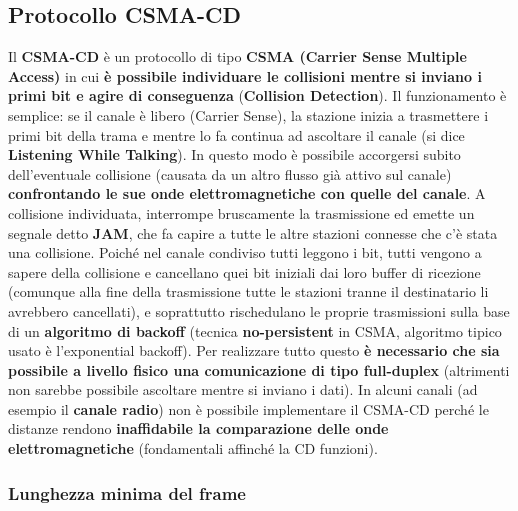\documentclass[12pt]{article}
\begin{document}
\subsection{Protocollo CSMA-CD}

Il \textbf{CSMA-CD} è un protocollo di tipo \textbf{CSMA (Carrier Sense Multiple Access)} in cui \textbf{è possibile individuare le collisioni mentre si inviano i primi bit e agire di conseguenza} (\textbf{Collision Detection}). Il funzionamento è semplice: se il canale è libero (Carrier Sense), la stazione inizia a trasmettere i primi bit della trama e mentre lo fa continua ad ascoltare il canale (si dice \textbf{Listening While Talking}). In questo modo è possibile accorgersi subito dell'eventuale collisione (causata da un altro flusso già attivo sul canale) \textbf{confrontando le sue onde elettromagnetiche con quelle del canale}. A collisione individuata, interrompe bruscamente la trasmissione ed emette un segnale detto \textbf{JAM}, che fa capire a tutte le altre stazioni connesse che c'è stata una collisione. Poiché nel canale condiviso tutti leggono i bit, tutti vengono a sapere della collisione e cancellano quei bit iniziali dai loro buffer di ricezione (comunque alla fine della trasmissione tutte le stazioni tranne il destinatario li avrebbero cancellati), e soprattutto rischedulano le proprie trasmissioni sulla base di un \textbf{algoritmo di backoff} (tecnica \textbf{no-persistent} in CSMA, algoritmo tipico usato è l'exponential backoff). Per realizzare tutto questo \textbf{è necessario che sia possibile a livello fisico una comunicazione di tipo full-duplex} (altrimenti non sarebbe possibile ascoltare mentre si inviano i dati). In alcuni canali (ad esempio il \textbf{canale radio}) non è possibile implementare il CSMA-CD perché le distanze rendono \textbf{inaffidabile la comparazione delle onde elettromagnetiche} (fondamentali affinché la CD funzioni).

\subsubsection{Lunghezza minima del frame}
\end{document}
